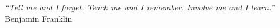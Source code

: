 \cleardoublepage
\thispagestyle{plain}

\vspace*{8cm}

\begin{flushright}
	\textsl{``Tell me and I forget. Teach me and I remember. Involve me and I learn.''}\\
	\vspace*{1.5cm}
	Benjamin Franklin
\end{flushright}
